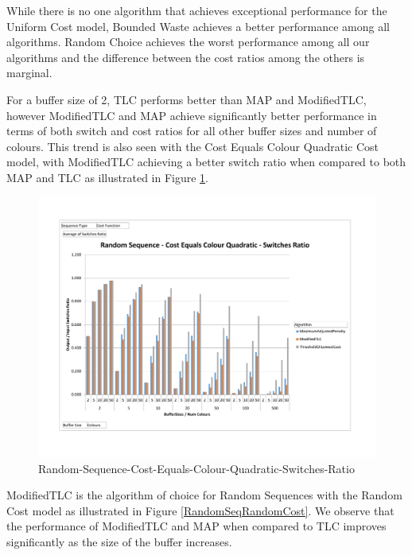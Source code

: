 While there is no one algorithm that achieves exceptional performance for the Uniform Cost model, Bounded Waste achieves a better performance among all algorithms. Random Choice achieves the worst performance among all our algorithms and the difference between the cost ratios among the others is marginal. 

For a buffer size of 2, TLC performs better than MAP and ModifiedTLC, however ModifiedTLC and MAP achieve significantly better performance in terms of both switch and cost ratios for all other buffer sizes and number of colours. This trend is also seen with the Cost Equals Colour Quadratic Cost model, with ModifiedTLC achieving a better switch ratio when compared to both MAP and TLC as illustrated in Figure \ref{RandomSeqCostEqualsColourQuadraticSwitches}. 

\begin{figure}[ht]
\centering 
\includegraphics[scale=0.60]{Random-Sequence-Cost-Equals-Colour-Quadratic-Switches.pdf}
\caption{Random-Sequence-Cost-Equals-Colour-Quadratic-Switches-Ratio}
\label{RandomSeqCostEqualsColourQuadraticSwitches}
\end{figure}

ModifiedTLC is the algorithm of choice for Random Sequences with the Random Cost model as illustrated in Figure \ref{RandomSeqRandomCost}.  We observe that the performance of ModifiedTLC and MAP when compared to TLC improves significantly as the size of the buffer increases. 

